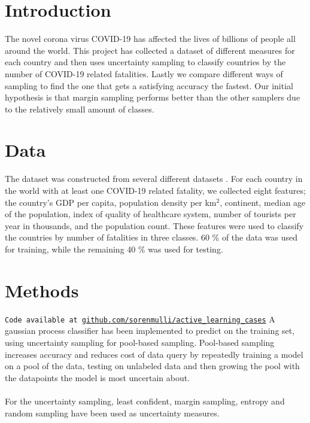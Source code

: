 \documentclass[12pt,fleqn]{article}
\begin{document}
	\begin{multicols}{2}
		
		
		\section{Introduction} %
		The novel corona virus COVID-19 has affected the lives of billions of people all around the world. This project has collected a dataset of different measures for each country and then uses uncertainty sampling to classify countries by the number of COVID-19 related fatalities. Lastly we compare different ways of sampling to find the one that gets a satisfying accuracy the fastest. Our initial hypothesis is that margin sampling performs better than the other samplers due to the relatively small amount of classes. 
		
		\section{Data}
		The dataset was constructed from several different datasets \cite{density, corona, alder, bnp, region, healthcare, turist}. For each country in the world with at least one COVID-19 related fatality, we collected eight features; the country's GDP per capita, population density per km$^2$, continent, median age of the population, index of quality of healthcare system, number of tourists per year in thousands, and the population count. These features were used to classify the countries by number of fatalities in three classes. 60 \% of the data was used for training, while the remaining 40 \% was used for testing. %

		\section{Methods}
		\texttt{Code available at \url{github.com/sorenmulli/active_learning_cases}} \newline
		A gaussian process classifier has been implemented to predict on the training set, using uncertainty sampling for pool-based sampling. Pool-based sampling increases accuracy and reduces cost of data query by repeatedly training a model on a pool of the data, testing on unlabeled data and then growing the pool with the datapoints the model is most uncertain about. \\\\
		For the uncertainty sampling, least confident, margin sampling, entropy and random sampling have been used as uncertainty measures.
		

\end{multicols}
\end{document}
